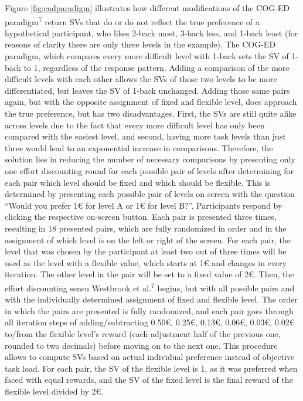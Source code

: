 \documentclass[
  man,floatsintext]{apa6}
\begin{document}
Figure \ref{fig:cadparadigm} illustrates how different modifications of the COG-ED paradigm\textsuperscript{7} return SVs that do or do not reflect the true preference of a hypothetical participant, who likes 2-back most, 3-back less, and 1-back least (for reasons of clarity there are only three levels in the example).
The COG-ED paradigm, which compares every more difficult level with 1-back sets the SV of 1-back to 1, regardless of the response pattern.
Adding a comparison of the more difficult levels with each other allows the SVs of those two levels to be more differentiated, but leaves the SV of 1-back unchanged.
Adding those same pairs again, but with the opposite assignment of fixed and flexible level, does approach the true preference, but has two disadvantages.
First, the SVs are still quite alike across levels due to the fact that every more difficult level has only been compared with the easiest level, and second, having more task levels than just three would lead to an exponential increase in comparisons.
Therefore, the solution lies in reducing the number of necessary comparisons by presenting only one effort discounting round for each possible pair of levels after determining for each pair which level should be fixed and which should be flexible.
This is determined by presenting each possible pair of levels on screen with the question ``Would you prefer 1€ for level A or 1€ for level B?''.
Participants respond by clicking the respective on-screen button.
Each pair is presented three times, resulting in 18 presented pairs, which are fully randomized in order and in the assignment of which level is on the left or right of the screen.
For each pair, the level that was chosen by the participant at least two out of three times will be used as the level with a flexible value, which starts at 1€ and changes in every iteration.
The other level in the pair will be set to a fixed value of 2€.
Then, the effort discounting sensu Westbrook et al.\textsuperscript{7} begins, but with all possible pairs and with the individually determined assignment of fixed and flexible level.
The order in which the pairs are presented is fully randomized, and each pair goes through all iteration steps of adding/subtracting 0.50€, 0.25€, 0.13€, 0.06€, 0.03€, 0.02€ to/from the flexible level's reward (each adjustment half of the previous one, rounded to two decimals) before moving on to the next one.
This procedure allows to compute SVs based on actual individual preference instead of objective task load.
For each pair, the SV of the flexible level is 1, as it was preferred when faced with equal rewards, and the SV of the fixed level is the final reward of the flexible level divided by 2€.
\end{document}

